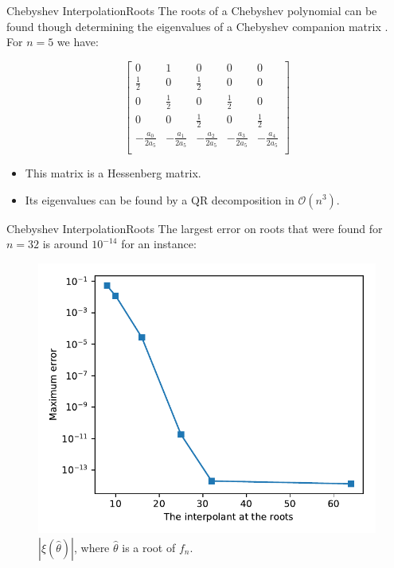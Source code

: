 \documentclass{beamer}
\newcommand{\bigO}{\mathscr{O}}
\begin{document}
\begin{frame}{Chebyshev Interpolation}{Roots}
	The roots of a Chebyshev polynomial can be found though determining the eigenvalues of a Chebyshev companion matrix \cite{boyd:2013}. For $n=5$ we have:
	
	\begin{equation*}
	\left[\begin{array}{cccccc}
	0&1&0&0&0\\
	\frac{1}{2} & 0 & \frac{1}{2} & 0 & 0\\
	0 & \frac{1}{2} & 0 & \frac{1}{2} & 0\\
	0 & 0 & \frac{1}{2} & 0 & \frac{1}{2}\\
	-\frac{a_0}{2a_5} & -\frac{a_1}{2a_5} &-\frac{a_2}{2a_5} &-\frac{a_3}{2a_5} &-\frac{a_4}{2a_5}\\
	\end{array}\right]
	\end{equation*}
	
	\begin{itemize}
		\item This matrix is a Hessenberg matrix.
		\item Its eigenvalues can be found by a QR decomposition in $\bigO(n^3)$.
	\end{itemize}
\end{frame}

\begin{frame}{Chebyshev Interpolation}{Roots}
	The largest error on roots that were found for $n=32$ is around $10^{-14}$ for an instance:
	\begin{figure}
		\centering
		
		\includegraphics[scale=.6]{error_roots}
		\caption{$|\xi(\hat{\theta})|$, where $\hat{\theta}$ is a root of $f_n$.}
	\end{figure}
\end{frame}
\end{document}
